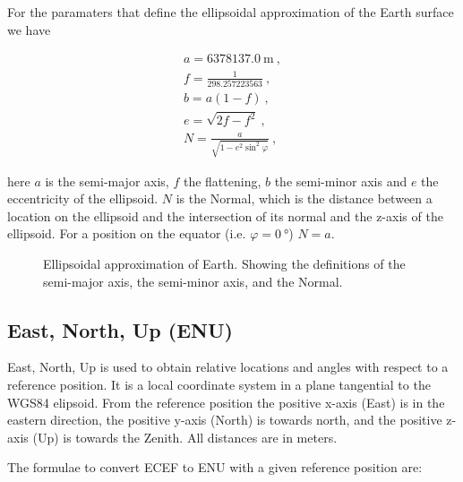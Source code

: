 \noindent
For the paramaters that define the ellipsoidal approximation of the
Earth surface we have

\begin{equation}
    \label{eq:wgs84}
    \begin{array}{l}
        a = \SI{6378137.0}{\meter} \ , \\
        f = \frac{1}{298.257223563} \ , \\
        b = a (1 - f) \ , \\
        e = \sqrt{2 f - f^2} \ , \\
        N = \frac{a}{\sqrt{1 - e^2 \sin^2 \varphi}} \ ,
    \end{array}
\end{equation}

\noindent here $a$ is the semi-major axis, $f$ the flattening, $b$ the
semi-minor axis and $e$ the eccentricity of the ellipsoid. $N$ is the
Normal, which is the distance between a location on the ellipsoid and
the intersection of its normal and the z-axis of the ellipsoid. For a
position on the equator (i.e. $\varphi = \SI{0}{\degree}$) $N = a$.

\begin{figure}
    \centering
    
    \caption{Ellipsoidal approximation of Earth. Showing the definitions
             of the semi-major axis, the semi-minor axis, and the Normal.}
    \label{fig:ellipsoid}
\end{figure}


\subsection{East, North, Up (ENU)}

East, North, Up is used to obtain relative locations and angles with
respect to a reference position. It is a local coordinate system in a
plane tangential to the WGS84 elipsoid. From the reference position the
positive x-axis (East) is in the eastern direction, the positive y-axis
(North) is towards north, and the positive z-axis (Up) is towards the
Zenith. All distances are in meters.

The formulae to convert ECEF to ENU with a given reference position are:

